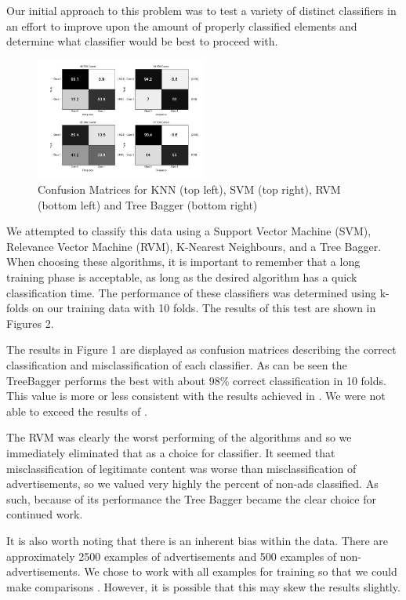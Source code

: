 Our initial approach to this problem was to test a variety of distinct classifiers in an effort to improve upon the amount of properly classified elements and determine what classifier would be best to proceed with.

\begin{figure}[h!]
  	\label{compall}
  	\centering
    \includegraphics[width=0.5\textwidth]{Figures/allcomp.jpg}
	\caption{Confusion Matrices for KNN (top left), SVM (top right), RVM (bottom left) and Tree Bagger (bottom right)}
\end{figure}

We attempted to classify this data using a Support Vector Machine (SVM), Relevance Vector Machine (RVM), K-Nearest Neighbours, and a Tree Bagger. When choosing these algorithms, it is important to remember that a long training phase is acceptable, as long as the desired algorithm has a quick classification time. The performance of these classifiers was determined using k-folds on our training data with 10 folds. The results of this test are shown in Figures 2.

The results in Figure 1 are displayed as confusion matrices describing the correct classification and misclassification of each classifier. As can be seen the TreeBagger performs the best with about 98\% correct classification in 10 folds. This value is more or less consistent with the results achieved in \cite{adeater}. We were not able to exceed the results of \cite{adeater}. 

The RVM was clearly the worst performing of the algorithms and so we immediately eliminated that as a choice for classifier. It seemed that misclassification of legitimate content was worse than misclassification of advertisements, so we valued very highly the percent of non-ads classified. As such, because of its performance the Tree Bagger became the clear choice for continued work. 

It is also worth noting that there is an inherent bias within the data. There are approximately 2500 examples of advertisements and 500 examples of non-advertisements. We chose to work with all examples for training so that we could make comparisons \cite{adeater}. However, it is possible that this may skew the results slightly.